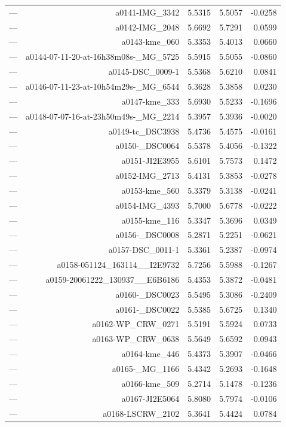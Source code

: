 \begin{table}[htbp]
\begin{tabular}{lrrrr}
— & a0141-IMG_3342 & 5.5315 & 5.5057 & -0.0258 \\
— & a0142-IMG_2048 & 5.6692 & 5.7291 & 0.0599 \\
— & a0143-kme_060 & 5.3353 & 5.4013 & 0.0660 \\
— & a0144-07-11-20-at-16h38m08s-_MG_5725 & 5.5915 & 5.5055 & -0.0860 \\
— & a0145-DSC_0009-1 & 5.5368 & 5.6210 & 0.0841 \\
— & a0146-07-11-23-at-10h54m29s-_MG_6544 & 5.3628 & 5.3858 & 0.0230 \\
— & a0147-kme_333 & 5.6930 & 5.5233 & -0.1696 \\
— & a0148-07-07-16-at-23h50m49s-_MG_2214 & 5.3957 & 5.3936 & -0.0020 \\
— & a0149-tc_DSC3938 & 5.4736 & 5.4575 & -0.0161 \\
— & a0150-_DSC0064 & 5.5378 & 5.4056 & -0.1322 \\
— & a0151-JI2E3955 & 5.6101 & 5.7573 & 0.1472 \\
— & a0152-IMG_2713 & 5.4131 & 5.3853 & -0.0278 \\
— & a0153-kme_560 & 5.3379 & 5.3138 & -0.0241 \\
— & a0154-IMG_4393 & 5.7000 & 5.6778 & -0.0222 \\
— & a0155-kme_116 & 5.3347 & 5.3696 & 0.0349 \\
— & a0156-_DSC0008 & 5.2871 & 5.2251 & -0.0621 \\
— & a0157-DSC_0011-1 & 5.3361 & 5.2387 & -0.0974 \\
— & a0158-051124_163114__I2E9732 & 5.7256 & 5.5988 & -0.1267 \\
— & a0159-20061222_130937__E6B6186 & 5.4353 & 5.3872 & -0.0481 \\
— & a0160-_DSC0023 & 5.5495 & 5.3086 & -0.2409 \\
— & a0161-_DSC0022 & 5.5385 & 5.6725 & 0.1340 \\
— & a0162-WP_CRW_0271 & 5.5191 & 5.5924 & 0.0733 \\
— & a0163-WP_CRW_0638 & 5.5649 & 5.6592 & 0.0943 \\
— & a0164-kme_446 & 5.4373 & 5.3907 & -0.0466 \\
— & a0165-_MG_1166 & 5.4342 & 5.2693 & -0.1648 \\
— & a0166-kme_509 & 5.2714 & 5.1478 & -0.1236 \\
— & a0167-JI2E5064 & 5.8080 & 5.7974 & -0.0106 \\
— & a0168-LSCRW_2102 & 5.3641 & 5.4424 & 0.0784 \\

\end{tabular}
\end{table}
